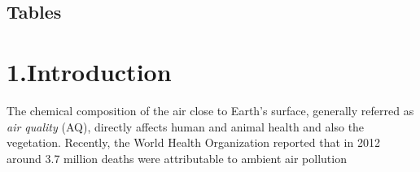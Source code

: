 \documentclass[9pt]{report}
\begin{document}
\begin{mdtoc}
\begin{mdtocblock}
\begin{mdtocblock}
\begin{mdtocblock}

\end{mdtocblock}%
\end{mdtocblock}%



\end{mdtocblock}%
\end{mdtoc}%
\begin{mdtoc}%

\section*{Tables}\label{sec-tables}%

\begin{mdtocblock}%


\end{mdtocblock}%
\end{mdtoc}%

\section{1.\hspace*{0.5em}Introduction}\label{sec-introduction}%

\noindent{}The chemical composition of the air close to Earth’s surface, generally referred as \emph{air quality} (AQ), directly affects human and animal health and also the vegetation. 
Recently, the World Health Organization reported that in 2012 around 3.7 million deaths were attributable to ambient air pollution %
\end{document}
